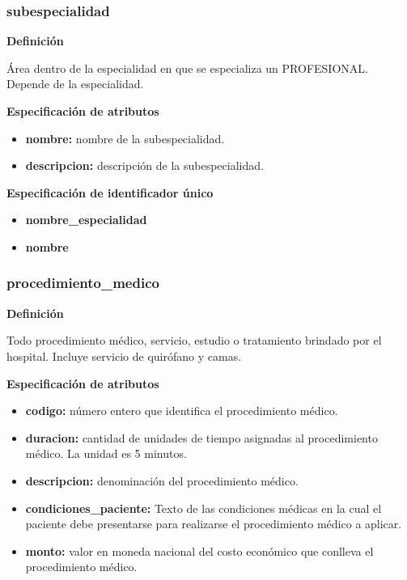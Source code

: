 \documentclass[a4paper,11pt]{article}
\begin{document}
\subsubsection{\textbf{subespecialidad}}

\textbf{Definición}

Área dentro de la especialidad en que se especializa un PROFESIONAL. Depende de 
la especialidad.

\textbf{Especificación de atributos}

\begin{itemize}

     \item \textbf{nombre:} nombre de la subespecialidad.

     \item \textbf{descripcion:} descripción de la subespecialidad.

\end{itemize}

\textbf{Especificación de identificador único}

\begin{itemize}

      \item \textbf{nombre\_especialidad}

      \item \textbf{nombre}

\end{itemize}

\subsubsection{\textbf{procedimiento\_medico}}

\textbf{Definición}

Todo procedimiento médico, servicio, estudio o tratamiento brindado por el hospital. 
Incluye servicio de quirófano y camas.

\textbf{Especificación de atributos}

\begin{itemize}

     \item \textbf{codigo:} número entero que identifica el procedimiento médico.

     \item \textbf{duracion:} cantidad de unidades de tiempo asignadas al procedimiento médico. La unidad es 5 minutos.

     \item \textbf{descripcion:} denominación del procedimiento médico.

     \item \textbf{condiciones\_paciente:} Texto de las condiciones médicas en la cual el paciente 
     debe presentarse para realizarse el procedimiento médico a aplicar.

     \item \textbf{monto:} valor en moneda nacional del costo económico que conlleva el procedimiento médico.

\end{itemize}
\end{document}

